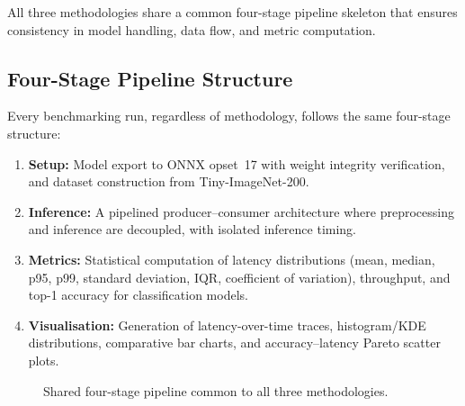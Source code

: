 All three methodologies share a common four-stage pipeline skeleton that
ensures consistency in model handling, data flow, and metric computation.

\subsection{Four-Stage Pipeline Structure}

Every benchmarking run, regardless of methodology, follows the same four-stage
structure:

\begin{enumerate}[leftmargin=2em, itemsep=1pt, topsep=3pt]
    \item \textbf{Setup:} Model export to ONNX opset~17 with weight integrity
          verification, and dataset construction from Tiny-ImageNet-200.
    \item \textbf{Inference:} A pipelined producer--consumer architecture
          where preprocessing and inference are decoupled, with isolated
          inference timing.
    \item \textbf{Metrics:} Statistical computation of latency distributions
          (mean, median, p95, p99, standard deviation, IQR, coefficient of
          variation), throughput, and top-1 accuracy for classification models.
    \item \textbf{Visualisation:} Generation of latency-over-time traces,
          histogram/KDE distributions, comparative bar charts, and
          accuracy--latency Pareto scatter plots.
\end{enumerate}

\begin{figure}[H]
\centering
{}
\caption{Shared four-stage pipeline common to all three methodologies.}
\label{fig:pipeline_overview}
\end{figure}

